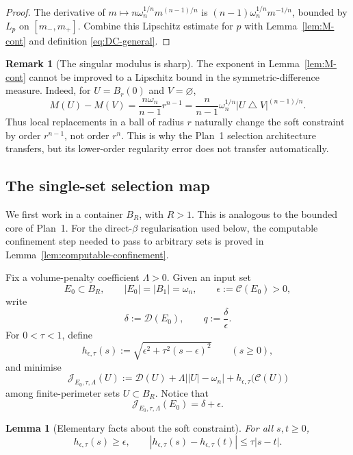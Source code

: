 \documentclass[11pt]{amsart}
\newtheorem{lemma}[theorem]{Lemma}
\theoremstyle{definition}
\newtheorem{remark}[theorem]{Remark}
\newcommand{\Def}{\mathcal D}
\begin{document}
\begin{proof}
The derivative of
\(m\mapsto n\omega_n^{1/n}m^{(n-1)/n}\) is
\((n-1)\omega_n^{1/n}m^{-1/n}\), bounded by \(L_p\) on
\([m_-,m_+]\).  Combine this Lipschitz estimate for \(p\) with
Lemma~\ref{lem:M-cont} and definition \eqref{eq:DC-general}.
\end{proof}

\begin{remark}[The singular modulus is sharp]\label{rem:M-sharp}
The exponent in Lemma~\ref{lem:M-cont} cannot be improved to a Lipschitz
bound in the symmetric-difference measure.  Indeed, for
\(U=B_r(0)\) and \(V=\varnothing\),
\[
   M(U)-M(V)
   =\frac{n\omega_n}{n-1}r^{n-1}
   =\frac{n}{n-1}\omega_n^{1/n}
      |U\mathbin{\triangle}V|^{(n-1)/n}.
\]
Thus local replacements in a ball of radius \(r\) naturally change the soft
constraint by order \(r^{n-1}\), not order \(r^n\).  This is why the
Plan~1 selection architecture transfers, but its lower-order regularity
error does not transfer automatically.
\end{remark}

\subsection{The single-set selection map}

We first work in a container \(B_R\), with \(R>1\).  This is analogous to
the bounded core of Plan~1.  For the direct-\(\beta\) regularisation used
below, the computable confinement step needed to pass to arbitrary sets is
proved in Lemma~\ref{lem:computable-confinement}.

Fix a volume-penalty coefficient \(\Lambda>0\).  Given an input set
\[
   E_0\subset B_R,\qquad |E_0|=|B_1|=\omega_n,\qquad
   \epsilon:=\mathcal C(E_0)>0,
\]
write
\[
   \delta:=\Def(E_0),\qquad q:=\frac{\delta}{\epsilon}.
\tag{4.12}\label{eq:input-q}
\]
For \(0<\tau<1\), define
\[
   h_{\epsilon,\tau}(s)
   :=\sqrt{\epsilon^2+\tau^2(s-\epsilon)^2}
   \qquad (s\ge0),
\tag{4.13}\label{eq:h}
\]
and minimise
\[
   \mathcal J_{E_0,\tau,\Lambda}(U)
   :=
   \Def(U)+\Lambda\bigl||U|-\omega_n\bigr|
   +h_{\epsilon,\tau}\bigl(\mathcal C(U)\bigr)
\tag{4.14}\label{eq:J-FJ}
\]
among finite-perimeter sets \(U\subset B_R\).  Notice that
\[
   \mathcal J_{E_0,\tau,\Lambda}(E_0)=\delta+\epsilon.
\tag{4.15}\label{eq:J-input}
\]

\begin{lemma}[Elementary facts about the soft constraint]\label{lem:h}
For all \(s,t\ge0\),
\[
   h_{\epsilon,\tau}(s)\ge\epsilon,
\qquad
   |h_{\epsilon,\tau}(s)-h_{\epsilon,\tau}(t)|
   \le\tau|s-t|.
\tag{4.16}\label{eq:h-properties}
\]
\end{lemma}
\end{document}
